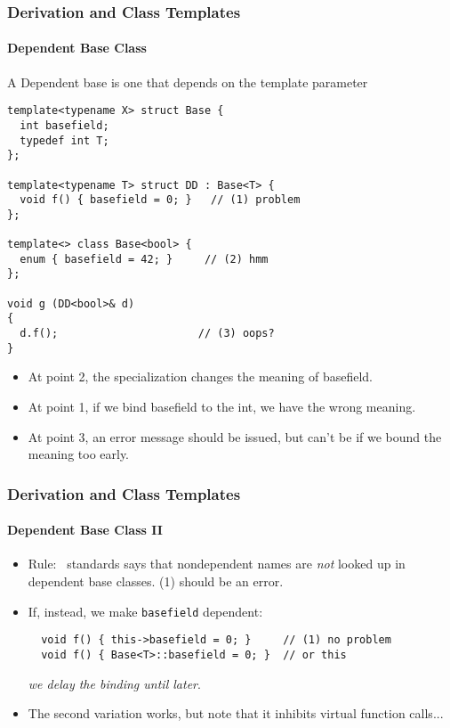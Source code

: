 \begin{frame}[fragile,t]
\frametitle{Derivation and Class Templates}
\framesubtitle{Dependent Base Class}
A Dependent base is one that depends on the template parameter
{\scriptsize
\begin{verbatim}
template<typename X> struct Base {
  int basefield;
  typedef int T;
};

template<typename T> struct DD : Base<T> {
  void f() { basefield = 0; }   // (1) problem
};

template<> class Base<bool> {
  enum { basefield = 42; }     // (2) hmm
};

void g (DD<bool>& d)
{
  d.f();                      // (3) oops?
}
\end{verbatim}
}

\begin{itemize}[<+->]
\item At point 2, the specialization changes the meaning of basefield.
\item At point 1, if we bind basefield to the int, we have the wrong meaning.
\item At point 3, an error message should be issued, but can't be if
  we bound the meaning too early.
\end{itemize}
\end{frame}
\begin{frame}[fragile,t]
\frametitle{Derivation and Class Templates}
\framesubtitle{Dependent Base Class II}
\begin{itemize}[<+->]
\item Rule: \CC\ standards says that nondependent names are \emph{not}
  looked up in dependent base classes.  (1) should be an error.
\item If, instead, we make \texttt{basefield} dependent: 
{\scriptsize
\begin{verbatim}
  void f() { this->basefield = 0; }     // (1) no problem
  void f() { Base<T>::basefield = 0; }  // or this

\end{verbatim}
}
\emph{we delay the binding until later}.
\item  The second variation works, but note that it inhibits virtual
  function calls...
\end{itemize}


\end{frame}


